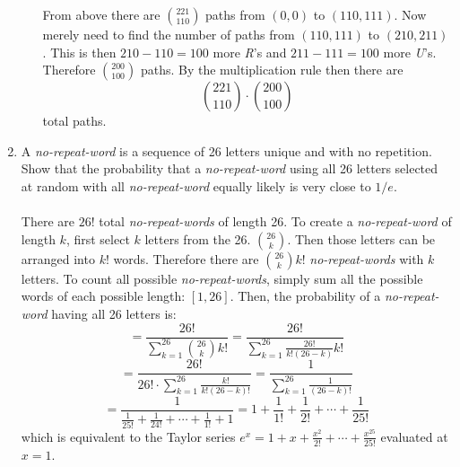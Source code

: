 \documentclass[11pt, oneside]{article}   	%
\begin{document}
\begin{enumerate}
\begin{enumerate}
				From above there are $\binom{221}{110}$ paths from $(0, 0)$ to $(110, 111)$. Now merely need to find the number of paths from $(110, 111)$ to $(210, 211)$. This is then $210 - 110 = 100$ more \textit{R}'s and $211 - 111 = 100$ more \textit{U}'s.
				Therefore $\binom{200}{100}$ paths. By the multiplication rule then there are \[ \binom{221}{110} \cdot \binom{200}{100} \] total paths.
			\end{enumerate}
		\item A \textit{no-repeat-word} is a sequence of 26 letters unique and with no repetition. Show that the probability that a \textit{no-repeat-word} using all 26 letters selected at random with all \textit{no-repeat-word}  equally likely is very close to $1/e$. \\\\
			There are $26!$ total \textit{no-repeat-words} of length 26. To create a \textit{no-repeat-word} of length $k$, first select $k$ letters from the 26. $\binom{26}{k}$. Then those letters can be arranged into $k!$ words. Therefore there are $\binom{26}{k}k!$
			\textit{no-repeat-words} with $k$ letters. To count all possible \textit{no-repeat-words}, simply sum all the possible words of each possible length: $[1, 26]$. Then, the probability of a \textit{no-repeat-word} having all 26 letters is:
			\[ 
				= \frac{26!}{\sum_{k=1}^{26} \binom{26}{k} k!} = \frac{26!}{\sum_{k=1}^{26} \frac{26!}{k!(26-k)} k!}
			\]
			\[
				= \frac{26!}{26! \cdot \sum_{k=1}^{26} \frac{k!}{k!(26-k)!} } = \frac{1}{\sum_{k=1}^{26} \frac{1}{(26-k)!}}
			\]
			\[
				= \frac{1}{ \frac{1}{25!} + \frac{1}{24!} + \cdots + \frac{1}{1!} + 1} = 1 + \frac{1}{1!} + \frac{1}{2!} + \cdots + \frac{1}{25!}
			\]
			which is equivalent to the Taylor series $e^x = 1 + x + \frac{x^2}{2!} + \cdots + \frac{x^{25}}{25!}$ evaluated at $x=1$.
	\end{enumerate}
\end{document}
